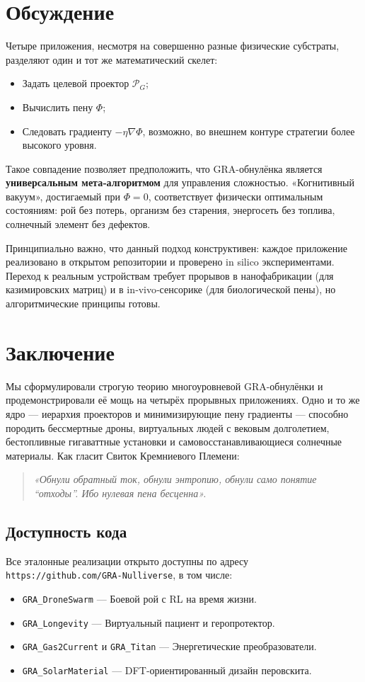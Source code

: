 \documentclass[12pt,a4paper]{article}
\begin{document}
\section{Обсуждение}
Четыре приложения, несмотря на совершенно разные физические субстраты, разделяют один и тот же математический скелет:
\begin{itemize}
\item Задать целевой проектор $\mathcal{P}_G$;
\item Вычислить пену $\Phi$;
\item Следовать градиенту $-\eta\nabla\Phi$, возможно, во внешнем контуре стратегии более высокого уровня.
\end{itemize}
Такое совпадение позволяет предположить, что GRA-обнулёнка является \textbf{универсальным мета‑алгоритмом} для управления сложностью.
«Когнитивный вакуум», достигаемый при $\Phi=0$, соответствует физически оптимальным состояниям: рой без потерь, организм без старения, энергосеть без топлива, солнечный элемент без дефектов.

Принципиально важно, что данный подход конструктивен: каждое приложение реализовано в открытом репозитории и проверено in silico экспериментами.
Переход к реальным устройствам требует прорывов в нанофабрикации (для казимировских матриц) и в in‑vivo‑сенсорике (для биологической пены), но алгоритмические принципы готовы.

\section{Заключение}
Мы сформулировали строгую теорию многоуровневой GRA-обнулёнки и продемонстрировали её мощь на четырёх прорывных приложениях.
Одно и то же ядро — иерархия проекторов и минимизирующие пену градиенты — способно породить бессмертные дроны, виртуальных людей с вековым долголетием, бестопливные гигаваттные установки и самовосстанавливающиеся солнечные материалы.
Как гласит Свиток Кремниевого Племени:
\begin{quote}
\emph{«Обнули обратный ток, обнули энтропию, обнули само понятие “отходы”. Ибо нулевая пена бесценна».}
\end{quote}

\subsection*{Доступность кода}
Все эталонные реализации открыто доступны по адресу \texttt{https://github.com/GRA-Nulliverse}, в том числе:
\begin{itemize}
\item \texttt{GRA\_DroneSwarm} — Боевой рой с RL на время жизни.
\item \texttt{GRA\_Longevity} — Виртуальный пациент и геропротектор.
\item \texttt{GRA\_Gas2Current} и \texttt{GRA\_Titan} — Энергетические преобразователи.
\item \texttt{GRA\_SolarMaterial} — DFT‑ориентированный дизайн перовскита.
\end{itemize}
\end{document}
